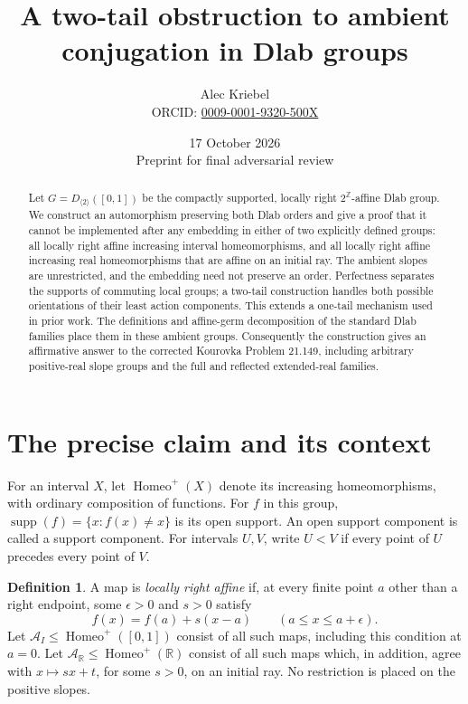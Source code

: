 \documentclass[10pt]{article}
\title{A two-tail obstruction to ambient conjugation in Dlab groups}
\author{Alec Kriebel\\
\small ORCID: \href{https://orcid.org/0009-0001-9320-500X}{0009-0001-9320-500X}}
\date{17 October 2026\\[3pt]
\small Preprint for final adversarial review}
\theoremstyle{definition}
\newtheorem{definition}[theorem]{Definition}
\newcommand{\R}{\mathbb R}
\newcommand{\Z}{\mathbb Z}
\newcommand{\supp}{\operatorname{supp}}
\newcommand{\Homeo}{\operatorname{Homeo}}
\newcommand{\AI}{\mathcal A_I}
\newcommand{\AR}{\mathcal A_{\R}}
\begin{document}
\maketitle

\begin{abstract}
Let $G=D_{\langle2\rangle}([0,1])$ be the compactly supported,
locally right $2^{\Z}$-affine Dlab group. We construct an automorphism
preserving both Dlab orders and give a proof that it cannot be implemented
after any embedding in either of two explicitly defined groups: all locally
right affine increasing interval homeomorphisms, and all locally right
affine increasing real homeomorphisms that are affine on an initial ray.
The ambient slopes are unrestricted, and the embedding need not preserve
an order. Perfectness separates the supports of commuting local groups;
a two-tail construction handles both possible orientations of their least
action components. This extends a one-tail mechanism used in prior work.
The definitions and affine-germ decomposition of the standard Dlab
families place them in these ambient groups. Consequently the construction
gives an affirmative answer to the corrected Kourovka Problem 21.149,
including arbitrary positive-real slope groups and the full and reflected
extended-real families.
\end{abstract}

\section{The precise claim and its context}

For an interval $X$, let $\Homeo^+(X)$ denote its increasing
homeomorphisms, with ordinary composition of functions. For $f$ in this
group, $\supp(f)=\{x:f(x)\ne x\}$ is its open support. An open support
component is called a support component. For intervals $U,V$, write $U<V$
if every point of $U$ precedes every point of $V$.

\begin{definition}
A map is \emph{locally right affine} if, at every finite point $a$ other
than a right endpoint, some $\epsilon>0$ and $s>0$ satisfy
\[
 f(x)=f(a)+s(x-a)\qquad(a\le x\le a+\epsilon).
\]
Let $\AI\le\Homeo^+([0,1])$ consist of all such maps, including this
condition at $a=0$. Let $\AR\le\Homeo^+(\R)$ consist of all such maps
which, in addition, agree with $x\mapsto sx+t$, for some $s>0$, on an
initial ray. No restriction is placed on the positive slopes.
\end{definition}
\end{document}
